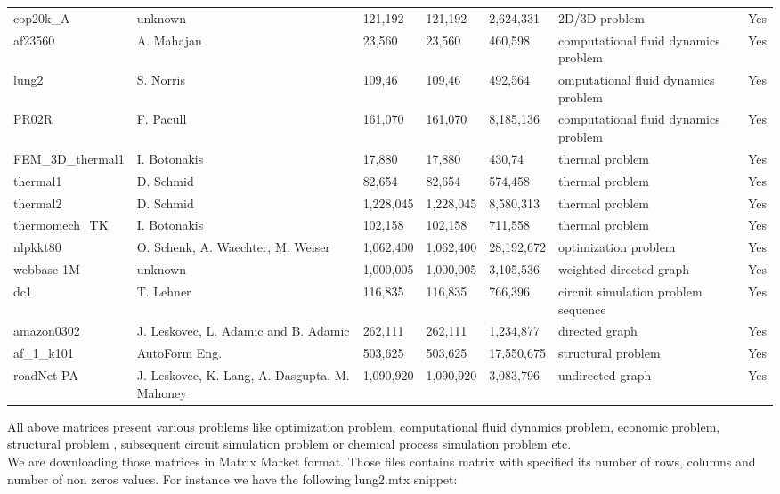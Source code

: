 \documentclass{scrreprt}
\begin{document}
\begin{longtable}[h!]{ |s|p{2cm}|p{1.3cm}|p{1.3cm}|p{1.5cm}|p{2cm}|p{0.5cm}|  }
cop20k_A & unknown &121,192 & 121,192 &2,624,331& 	2D/3D problem &  Yes   \\
af23560 & 	A. Mahajan &23,560 & 23,560 &460,598 & computational fluid dynamics problem &  Yes   \\
lung2 & S. Norris &109,46 &109,46 &492,564 & omputational fluid dynamics problem &  Yes   \\
PR02R & F. Pacull &161,070& 161,070 &8,185,136 & computational fluid dynamics problem &  Yes   \\
FEM_3D_thermal1 & 	I. Botonakis &17,880 & 17,880 &430,74 & thermal problem&  Yes   \\
thermal1 & D. Schmid &82,654 & 82,654 &574,458 & thermal problem &  Yes   \\
thermal2 & 	D. Schmid &1,228,045 & 1,228,045 &8,580,313& thermal problem &  Yes   \\
thermomech_TK & I. Botonakis &102,158& 102,158 &711,558& thermal problem &  Yes   \\
nlpkkt80 & O. Schenk, A. Waechter, M. Weiser &1,062,400 & 1,062,400 &28,192,672 & optimization problem &  Yes   \\
webbase-1M & 	unknown &1,000,005 & 1,000,005 &3,105,536 & weighted directed graph &  Yes   \\
dc1 & T. Lehner &116,835 & 116,835 &766,396 & circuit simulation problem sequence& Yes   \\
amazon0302 & 	J. Leskovec, L. Adamic and B. Adamic &262,111 & 262,111 &1,234,877 & directed graph &  Yes   \\
af_1_k101 & AutoForm Eng. &503,625 & 503,625 &17,550,675 & structural problem &  Yes   \\
roadNet-PA & 	J. Leskovec, K. Lang, A. Dasgupta, M. Mahoney &1,090,920 & 1,090,920 &3,083,796 & 	undirected graph &  Yes   \\

\hline
\end{longtable}
\FloatBarrier



All above matrices present various problems like optimization problem, computational fluid dynamics problem, economic problem, structural problem , subsequent circuit simulation problem or chemical process simulation problem etc.
\\
We are downloading those matrices in Matrix Market format. Those files contains matrix with specified its number of rows, columns and number of non zeros values. For instance we have the following lung2.mtx snippet:
\end{document}
